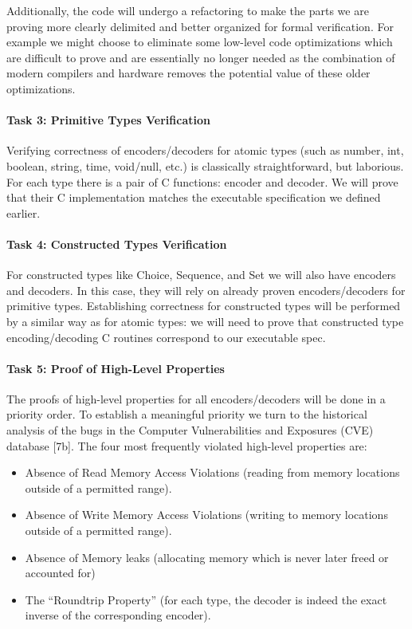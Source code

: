 \documentclass[acmsmall,nonacm]{acmart}
\begin{document}
Additionally, the code will undergo a refactoring to make the parts we are proving more clearly delimited and better organized for formal verification. For example we might choose to eliminate some low-level code optimizations which are difficult to prove and are essentially no longer needed as the combination of modern compilers and hardware removes the potential value of these older optimizations.

\paragraph{Task 3: Primitive Types Verification}
Verifying correctness of encoders/decoders for atomic types (such as number, int, boolean, string, time, void/null, etc.) is classically straightforward, but laborious. For each type there is a pair of C functions: encoder and decoder. We will prove that their C implementation matches the executable specification we defined earlier.

\paragraph{Task 4: Constructed Types Verification}
For constructed types like Choice, Sequence, and Set we will also have encoders and decoders. In this case, they will rely on already proven encoders/decoders for primitive types. Establishing correctness for constructed types will be performed by a similar way as for atomic types: we will need to prove that constructed type encoding/decoding C routines correspond to our executable spec. 

\paragraph{Task 5: Proof of High-Level Properties} 
The proofs of high-level properties for all encoders/decoders will be done in a priority order. To establish a meaningful priority we turn to the historical analysis of the bugs in the Computer Vulnerabilities and Exposures (CVE) database [7b]. The four most frequently violated high-level properties are:
\begin{itemize}

\item Absence of Read Memory Access Violations (reading from memory locations outside of a permitted range).
\item Absence of Write Memory Access Violations (writing to memory locations outside of a permitted range).
\item Absence of Memory leaks (allocating memory which is never later freed or accounted for)
\item The ``Roundtrip Property'' (for each type, the decoder is indeed the exact inverse of the corresponding encoder).
\end{itemize}
\end{document}
